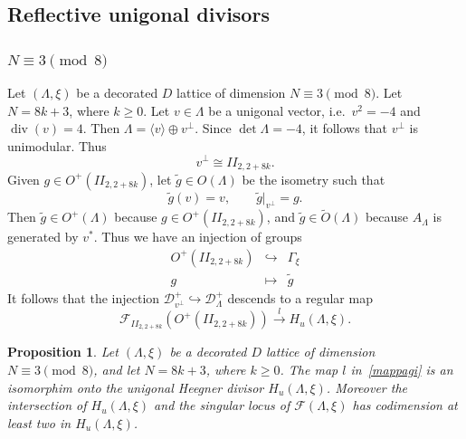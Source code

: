 \documentclass[11pt]{amsart}
\numberwithin{equation}{subsection}
\theoremstyle{plain}
\newtheorem{proposition}[theorem]{Proposition}
\theoremstyle{remark}
\theoremstyle{definition}
\newcommand{\cD}{{\mathscr D}}
\newcommand{\cF}{{\mathscr F}}
\newcommand{\hra}{\hookrightarrow}
\newcommand{\la}{\langle}
\newcommand{\lra}{\longrightarrow}
\newcommand{\ra}{\rangle}
\newcommand{\wt}{\widetilde}
\DeclareMathOperator{\divisore}{div}
\begin{document}
\subsection{Reflective unigonal divisors}
\setcounter{equation}{0}
%
%
\subsubsection{$N\equiv 3\pmod{8}$}\label{subsubsec:unigon3}
%
Let $(\Lambda,\xi)$ be a decorated $D$ lattice of dimension $N\equiv 3\pmod{8}$. Let $N=8k+3$, where $k\ge 0$. Let $v\in\Lambda$ be a unigonal vector, i.e.~$v^2=-4$ and $\divisore(v)=4$. Then $\Lambda=\la v\ra\oplus v^{\bot}$. Since $\det\Lambda=-4$, it follows that $v^{\bot}$ is unimodular. Thus
%
\begin{equation}\label{perpunig}
%
v^{\bot}\cong II_{2,2+8k}.
%
\end{equation}
%
Given $g\in O^{+}( II_{2,2+8k})$, let $\wt{g}\in O(\Lambda)$ be the isometry such that 
%
\begin{equation}
%
\wt{g}(v)=v,\qquad \wt{g}|_{v^{\bot}}=g.
%
\end{equation}
%
Then $\wt{g}\in O^{+}(\Lambda)$ because $g\in O^{+}( II_{2,2+8k})$, and $\wt{g}\in \wt{O}(\Lambda)$ because $A_{\Lambda}$ is generated by $v^{*}$. Thus we have an injection of groups
%
\begin{equation}
%
\begin{matrix}
%
 O^{+}( II_{2,2+8k}) & \hra & \Gamma_{\xi} \\
 g & \mapsto & \wt{g}
%
\end{matrix}
%
\end{equation}
%
It follows that the injection $\cD^{+}_{v^{\bot}}\hra \cD^{+}_{\Lambda}$ descends to a regular map
%
\begin{equation}\label{mappagi}
%
\cF_{II_{2,2+8k}}(O^{+}( II_{2,2+8k}))\overset{l}{\lra} H_u(\Lambda,\xi). 
%
\end{equation}
%
\begin{proposition}\label{prp:unigcong3}
%
Let $(\Lambda,\xi)$ be a decorated $D$ lattice of dimension $N\equiv 3\pmod{8}$, and  let $N=8k+3$, where $k\ge 0$. The map $l$ in~\eqref{mappagi} is an isomorphim onto the unigonal Heegner divisor $H_u(\Lambda,\xi)$. Moreover the intersection of $H_u(\Lambda,\xi)$ and the singular locus of $\cF(\Lambda,\xi)$ has codimension at least two in  $H_u(\Lambda,\xi)$. 
%
\end{proposition}
%
\end{document}

